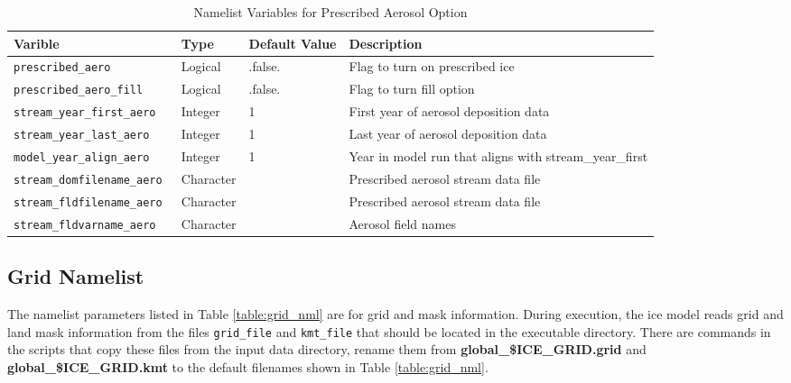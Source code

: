 \begin{table}
  \begin{center}
  \caption{Namelist Variables for Prescribed Aerosol Option}
  \label{table:ice_prescraero_nml}
  \begin{tabular}{p{4.0cm}p{2.0cm}p{3cm}p{6.0cm}} \hline
  Varible & Type & Default Value & Description               \\
\hline \hline

{\tt prescribed\_aero} & Logical & .false. &  Flag to turn on prescribed ice \\

{\tt prescribed\_aero\_fill } & Logical & .false. &  Flag to turn fill option \\

{\tt stream\_year\_first\_aero } & Integer & 1 & First year of aerosol deposition data \\

{\tt stream\_year\_last\_aero } & Integer & 1 & Last year of aerosol deposition data \\

{\tt model\_year\_align\_aero } & Integer & 1 & Year in model run that aligns with stream\_year\_first \\

{\tt stream\_domfilename\_aero } & Character & & Prescribed aerosol stream data file \\

{\tt stream\_fldfilename\_aero } & Character & & Prescribed aerosol stream data file \\

{\tt stream\_fldvarname\_aero } & Character & & Aerosol field names \\

  \hline
  \end{tabular}
  \end{center}
\end{table}

\subsection{Grid Namelist}

The namelist parameters listed in Table \ref{table:grid_nml} are for
grid and mask information.  During execution, the ice model reads grid and 
land mask information from the files {\tt grid\_file} and {\tt kmt\_file} that 
should be located in the executable directory. There are commands in the 
scripts that copy these files from the input data directory, rename them from 
{\bf global\_\${ICE\_GRID}.grid} and {\bf global\_\${ICE\_GRID}.kmt} to the
default filenames shown in Table \ref{table:grid_nml}.

